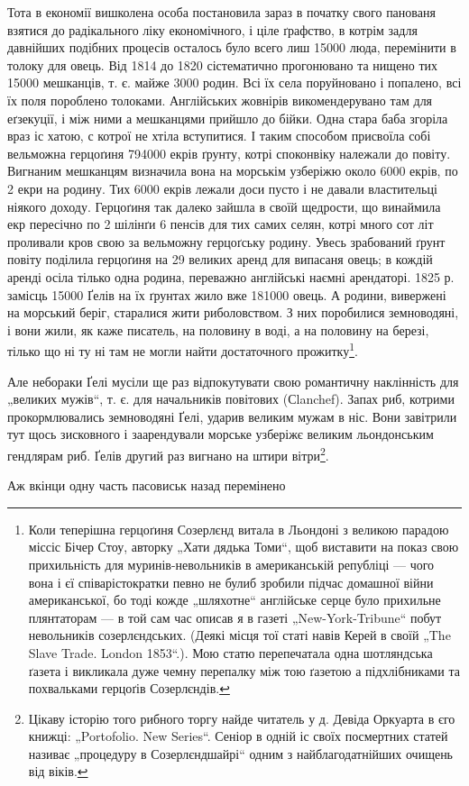 Тота в економії вишколена особа постановила зараз в початку свого панованя взятися до радікального
ліку економічного, і ціле ґрафство, в котрім задля давнійших подібних процесів осталось
було всего лиш 15000 люда, перемінити в толоку для овець. Від 1814 до 1820 сістематично
прогонювано та нищено тих 15000 мешканців, т. є. майже 3000 родин. Всі їх села поруйновано і
попалено, всі їх поля пороблено толоками. Англійських жовнірів викомендерувано там для еґзекуції, і
між ними а мешканцями прийшло до бійки. Одна
стара баба згоріла враз іс хатою, с котрої не хтіла вступитися. І таким способом присвоїла собі
вельможна герцоґиня 794000 екрів ґрунту, котрі споконвіку належали до
повіту. Вигнаним мешканцям визначила вона на морськім узберіжю около 6000 екрів, по 2 екри на
родину. Тих 6000 екрів лежали доси пусто і не давали властительці ніякого
доходу. Герцоґиня так далеко зайшла в своїй щедрости, що винаймила екр пересічно по 2 шілінґи 6
пенсів для тих самих селян, котрі много сот літ проливали кров свою за
вельможну герцоґську родину. Увесь зрабований ґрунт повіту поділила герцоґиня на 29 великих аренд
для випасаня овець; в кождій аренді осіла тілько одна родина, переважно англійські наємні
арендаторі. 1825 р. замісць 15000 Ґелів на їх ґрунтах жило вже 181000 овець. А родини, вивержені на
морський беріг, старалися жити риболовством. З них поробилися земноводяні, і вони жили, як каже
писатель, на половину в воді, а на половину на березі, тілько що ні ту ні там не могли найти
достаточного прожитку\footnote{
Коли теперішна герцоґиня Созерлєнд витала в Льондоні з великою парадою міссіс Бічер Стоу,
авторку „Хати дядька Томи“, щоб виставити на показ свою прихильність для муринів-невольників в
американській републіці — чого вона і єї співарістократки певно не булиб зробили підчас домашної
війни американської, бо тоді кожде „шляхотне“ англійське серце було прихильне плянтаторам — в той
сам час описав
я в газеті „New-York-Tribune“ побут невольників созерлєндських. (Деякі місця тої статі навів Керей в
своїй „The Slave Trade. London 1853“.). Мою статю перепечатала одна шотляндська ґазета і викликала
дуже чемну перепалку між тою ґазетою а підхлібниками та похвальками герцоґів Созерлєндів.
}.

Але небораки Ґелі мусіли ще раз відпокутувати свою романтичну наклінність для „великих мужів“, т. є.
для начальників повітових (Сlanchef). Запах риб, котрими прокормлювались земноводяні Ґелі, ударив
великим мужам в ніс. Вони завітрили тут щось зисковного і заарендували морське узберіжє великим
льондонським гендлярам риб. Ґелів другий раз вигнано на штири вітри\footnote{
Цікаву історію того рибного торгу найде читатель у д. Девіда Оркуарта в єго книжці: „Portofolio.
New Series“. Сеніор в одній іс своїх посмертних статей називає „процедуру в Созерлєндшайрі“ одним з
найблагодатнійших очищень від віків.
}.

Аж вкінци одну часть пасовиськ назад перемінено
\parbreak{}
